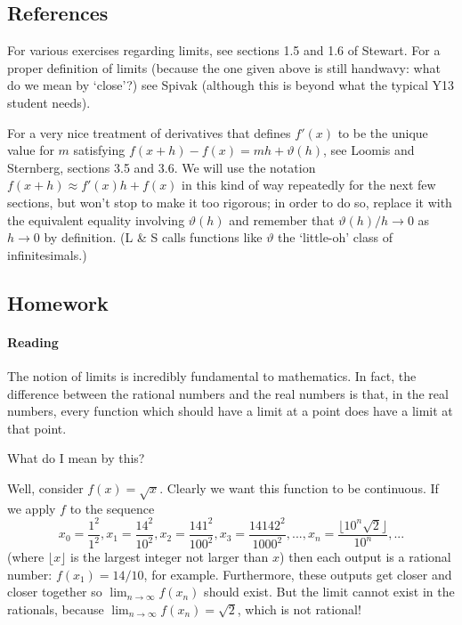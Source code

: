 \subsection{References}
For various exercises regarding limits, see sections 1.5 and 1.6 of Stewart. For a proper definition of limits (because the one given
above is still handwavy: what do we mean by `close'?) see Spivak (although this is beyond what the typical Y13 student needs).

For a very nice treatment of derivatives that defines $ f'(x) $ to be the unique value for $ m $ satisfying $ f(x + h) - f(x) = mh + \vartheta(h) $,
see Loomis and Sternberg, sections 3.5 and 3.6. We will use the notation $ f(x + h) \approx f'(x) h + f(x) $ in this kind of way repeatedly
for the next few sections, but won't stop to make it too rigorous; in order to do so, replace it with the equivalent equality involving $ \vartheta(h) $
and remember that $ \vartheta(h)/h \to 0 $ as $ h \to 0 $ by definition. (L \& S calls functions like $ \vartheta $ the `little-oh' class of infinitesimals.)

\subsection{Homework}
\paragraph{Reading}
The notion of limits is incredibly fundamental to mathematics. In fact, the difference between the rational numbers and the real
numbers is that, in the real numbers, every function which should have a limit at a point does have a limit at that point.

What do I mean by this?

Well, consider $ f(x) = \sqrt{x} $. Clearly we want this function to be continuous. If we apply $ f $ to the sequence
\begin{displaymath}
  x_0 = \frac{1^2}{1^2}, x_1 = \frac{14^2}{10^2}, x_2 = \frac{141^2}{100^2}, x_3 = \frac{14142^2}{1000^2}, ..., x_n = \frac{\lfloor 10^n \sqrt{2} \rfloor}{10^n}, ...
\end{displaymath}
(where $ \lfloor x \rfloor $ is the largest integer not larger than $ x $) then each output is a rational number: $ f(x_1) = 14/10 $,
for example. Furthermore, these outputs get closer and closer together so $ \lim_{n \to \infty} f(x_n) $ should exist. But the limit
cannot exist in the rationals, because $ \lim_{n \to \infty} f(x_n) = \sqrt{2} $, which is not rational!

